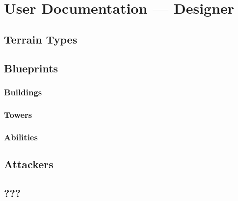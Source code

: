 \chapter{User Documentation --- Designer}

\section{Terrain Types}

\section{Blueprints}

\subsection{Buildings}

\subsection{Towers}

\subsection{Abilities}

\section{Attackers}

\section{???}